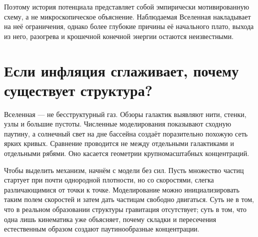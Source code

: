 \begin{classroomqa}
\end{classroomqa}

Поэтому история потенциала представляет собой эмпирически мотивированную схему, а не микроскопическое объяснение. Наблюдаемая Вселенная накладывает на неё ограничения, однако более глубокие причины её начального плато, выхода из него, разогрева и крошечной конечной энергии остаются неизвестными.

\section{Если инфляция сглаживает, почему существует структура?}

Вселенная — не бесструктурный газ. Обзоры галактик выявляют нити, стенки, узлы и большие пустоты. Численные моделирования показывают сходную паутину, а солнечный свет на дне бассейна создаёт поразительно похожую сеть ярких кривых. Сравнение проводится не между отдельными галактиками и отдельными рябями. Оно касается геометрии крупномасштабных концентраций.

Чтобы выделить механизм, начнём с модели без сил. Пусть множество частиц стартует при почти однородной плотности, но со скоростями, слегка различающимися от точки к точке. Моделирование можно инициализировать таким полем скоростей и затем дать частицам свободно двигаться. Суть не в том, что в реальном образовании структуры гравитация отсутствует; суть в том, что одна лишь кинематика уже объясняет, почему складки и пересечения естественным образом создают паутинообразные концентрации.

\begin{classroomqa}
\end{classroomqa}


